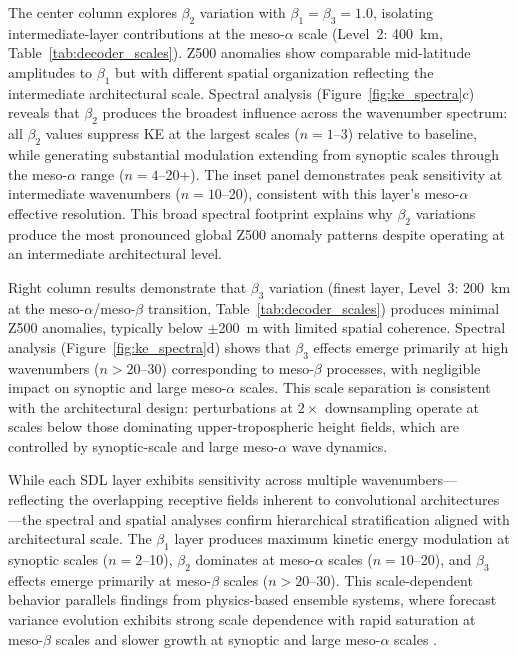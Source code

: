 \documentclass{agujournal2019}
\begin{document}
The center column explores $\beta_2$ variation with $\beta_1 = \beta_3 = 1.0$, isolating intermediate-layer contributions at the meso-$\alpha$ scale (Level~2: 400~km, Table~\ref{tab:decoder_scales}). Z500 anomalies show comparable mid-latitude amplitudes to $\beta_1$ but with different spatial organization reflecting the intermediate architectural scale. Spectral analysis (Figure~\ref{fig:ke_spectra}c) reveals that $\beta_2$ produces the broadest influence across the wavenumber spectrum: all $\beta_2$ values suppress KE at the largest scales ($n=1$--3) relative to baseline, while generating substantial modulation extending from synoptic scales through the meso-$\alpha$ range ($n=4$--20+). The inset panel demonstrates peak sensitivity at intermediate wavenumbers ($n=10$--20), consistent with this layer's meso-$\alpha$ effective resolution. This broad spectral footprint explains why $\beta_2$ variations produce the most pronounced global Z500 anomaly patterns despite operating at an intermediate architectural level.

Right column results demonstrate that $\beta_3$ variation (finest layer, Level~3: 200~km at the meso-$\alpha$/meso-$\beta$ transition, Table~\ref{tab:decoder_scales}) produces minimal Z500 anomalies, typically below $\pm$200~m with limited spatial coherence. Spectral analysis (Figure~\ref{fig:ke_spectra}d) shows that $\beta_3$ effects emerge primarily at high wavenumbers ($n>20$--30) corresponding to meso-$\beta$ processes, with negligible impact on synoptic and large meso-$\alpha$ scales. This scale separation is consistent with the architectural design: perturbations at $2\times$ downsampling operate at scales below those dominating upper-tropospheric height fields, which are controlled by synoptic-scale and large meso-$\alpha$ wave dynamics.

While each SDL layer exhibits sensitivity across multiple wavenumbers—reflecting the overlapping receptive fields inherent to convolutional architectures—the spectral and spatial analyses confirm hierarchical stratification aligned with architectural scale. The $\beta_1$ layer produces maximum kinetic energy modulation at synoptic scales ($n=2$--10), $\beta_2$ dominates at meso-$\alpha$ scales ($n=10$--20), and $\beta_3$ effects emerge primarily at meso-$\beta$ scales ($n>20$--30). This scale-dependent behavior parallels findings from physics-based ensemble systems, where forecast variance evolution exhibits strong scale dependence with rapid saturation at meso-$\beta$ scales and slower growth at synoptic and large meso-$\alpha$ scales \cite{rodwell2025}.
\end{document}
